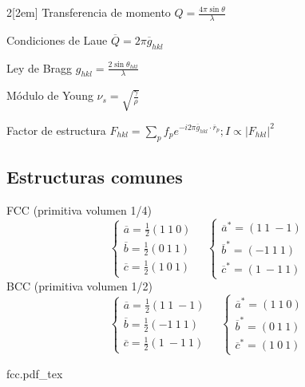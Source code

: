 \documentclass[leqno]{article}
\newcommand{\incfig}[1]{%
\begin{center}
\def\svgwidth{0.9\columnwidth}
{#1.pdf_tex}
\end{center}
}
\begin{document}
\begin{multicols}{2}[\columnsep2em]
Transferencia de momento $Q = \frac{4\pi \sin\theta }{\lambda}$

Condiciones de Laue $\overline{Q}=2\pi \overline{g}_{hkl}$

Ley de Bragg $g_{hkl} = \frac{2\sin \theta_{hkl}}{\lambda}$ 

Módulo de Young $\nu_s = \sqrt{\frac{\gamma}{\rho }} $

Factor de estructura $F_{hkl} = \sum_p f_p e^{-i2\pi \overline{g}_{hkl}\cdot \overline{r}_p}; I \propto |F_{hkl}|^2 $

\subsection{Estructuras comunes}

FCC (primitiva volumen 1/4)
\[
\begin{cases}
  \overline{a} = \frac{1}{2} (1\ 1\ 0) \\
  \overline{b} = \frac{1}{2} (0\ 1\ 1) \\
  \overline{c} = \frac{1}{2} (1\ 0\ 1)
\end{cases} \quad 
\begin{cases}
  \overline{a}^* = (1\ 1\ -1)\\
  \overline{b}^* = (-1\ 1\ 1 )\\
  \overline{c}^* = (1\ -1\ 1)
\end{cases} 
\]
BCC (primitiva volumen 1/2)
\[
\begin{cases}
  \overline{a} = \frac{1}{2} (1\ 1\ -1) \\
  \overline{b} = \frac{1}{2} (-1\ 1\ 1) \\
  \overline{c} = \frac{1}{2} (1\ -1\ 1)
\end{cases} \quad 
\begin{cases}
  \overline{a}^* = (1\ 1\ 0)\\
  \overline{b}^* = (0\ 1\ 1 )\\
  \overline{c}^* = (1\ 0\ 1)
\end{cases} 
\]
\begin{minipage}{\columnwidth}
\incfig{fcc}
\end{minipage}


\end{multicols}
\end{document}
